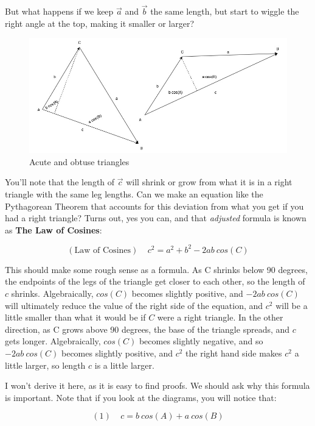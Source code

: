 \documentclass[
]{book}
\begin{document}
But what happens if we keep \(\vec{a}\) and \(\vec{b}\) the same length, but start to wiggle the right angle at the top, making it smaller or larger?

\begin{figure}

{\centering \includegraphics[width=0.75\linewidth,height=0.75\textheight]{images/LofC-acute-obtuse} 

}

\caption{Acute and obtuse triangles}\label{fig:unnamed-chunk-8}
\end{figure}

You'll note that the length of \(\vec{c}\) will shrink or grow from what it is in a right triangle with the same leg lengths. Can we make an equation like the Pythagorean Theorem that accounts for this deviation from what you get if you had a right triangle? Turns out, yes you can, and that \emph{adjusted} formula is known as \textbf{The Law of Cosines}:

\[(\text{Law of Cosines}) \ \ \ \ \ c^2 = a^2 + b^2 - 2 a b \ cos(C)\]

This should make some rough sense as a formula. As C shrinks below 90 degrees, the endpoints of the legs of the triangle get closer to each other, so the length of \(c\) shrinks. Algebraically, \(cos(C)\) becomes slightly positive, and \(-2 a b \ cos(C)\) will ultimately reduce the value of the right side of the equation, and \(c^2\) will be a little smaller than what it would be if \(C\) were a right triangle. In the other direction, as C grows above 90 degrees, the base of the triangle spreads, and \(c\) gets longer. Algebraically, \(cos(C)\) becomes slightly negative, and so \(-2 a b \ cos(C)\) becomes slightly positive, and \(c^2\) the right hand side makes \(c^2\) a little larger, so length \(c\) is a little larger.

I won't derive it here, as it is easy to find proofs. We should ask why this formula is important. Note that if you look at the diagrams, you will notice that:

\[(1) \ \ \ \ \ c = b \ cos(A) + a \ cos(B)\]
\end{document}
